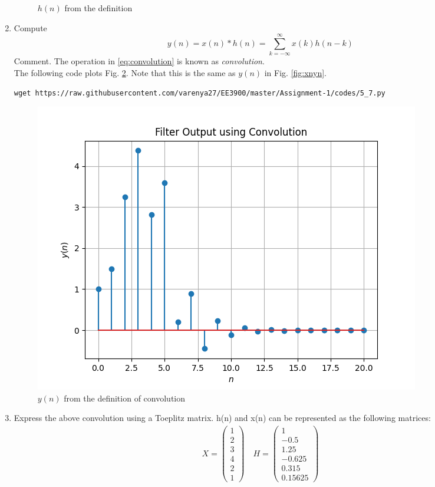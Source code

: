 \documentclass[journal,12pt,twocolumn]{IEEEtran}
\renewcommand\thesection{\arabic{section}}
\begin{document}
\begin{enumerate}[label=\thesection.\arabic*]
\begin{figure}[!ht]
\caption{$h(n)$ from the definition}
\label{fig:hndef}
\end{figure}
%
\item Compute 
%
\begin{equation}
\label{eq:convolution}
y(n) = x(n)*h(n) = \sum_{k=-\infty}^{\infty}x(k)h(n-k)
\end{equation}
%
Comment. The operation in \eqref{eq:convolution} is known as
{\em convolution}.
%
\\
\solution The following code plots Fig. \ref{fig:ynconv}. Note that this is the same as 
$y(n)$ in  Fig. 
\ref{fig:xnyn}. 
%
\begin{lstlisting}
wget https://raw.githubusercontent.com/varenya27/EE3900/master/Assignment-1/codes/5_7.py
\end{lstlisting}
\begin{figure}[!ht]
\centering
\includegraphics[width=\columnwidth]{figures/Figure_5.png}
\caption{$y(n)$ from the definition of convolution}
\label{fig:ynconv}
\end{figure}
\item Express the above convolution using a Toeplitz matrix.
\solution h(n) and x(n) can be represented as the following matrices:
\begin{align}
    X=\begin{pmatrix}1\\2\\3\\4\\2\\1
    \end{pmatrix}\quad
    H = \begin{pmatrix}1\\-0.5\\1.25\\-0.625\\0.315\\0.15625

\end{pmatrix}
\end{align}
\end{enumerate}
\end{document}
